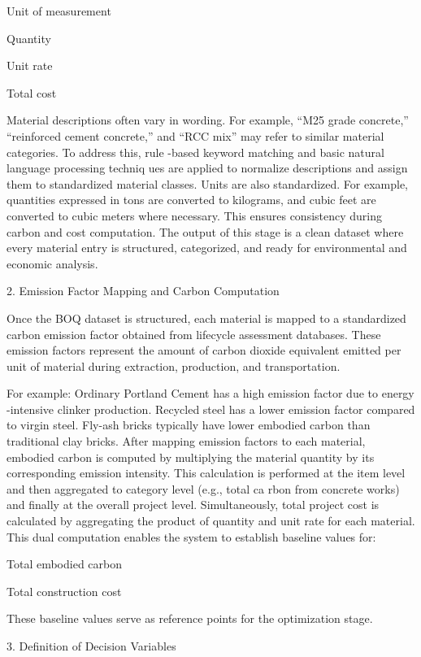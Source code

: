 \documentclass[10pt,twocolumn]{article}
\begin{document}
Unit of measurement  
 
Quantity  
 
Unit rate  
 
Total cost  
 
Material descriptions often vary in wording. For example, “M25 grade concrete,” “reinforced cement 
concrete,” and “RCC mix” may refer to similar material categories. To address this, rule -based 
keyword matching and basic natural language processing techniq ues are applied to normalize 
descriptions and assign them to standardized material classes.  
Units are also standardized. For example, quantities expressed in tons are converted to kilograms, 
and cubic feet are converted to cubic meters where necessary. This ensures consistency during 
carbon and cost computation.  
The output of this stage is a clean dataset where every material entry is structured, categorized, and 
ready for environmental and economic analysis.  
 
2. Emission Factor Mapping and Carbon Computation  
 
Once the BOQ dataset is structured, each material is mapped to a standardized carbon emission 
factor obtained from lifecycle assessment databases. These emission factors represent the amount of 
carbon dioxide equivalent emitted per unit of material during extraction, production, and 
transportation.  
 
For example:  
Ordinary Portland Cement has a high emission factor due to energy -intensive clinker production.  
Recycled steel has a lower emission factor compared to virgin steel.  
Fly-ash bricks typically have lower embodied carbon than traditional clay bricks.  
After mapping emission factors to each material, embodied carbon is computed by multiplying the 
material quantity by its corresponding emission intensity. This calculation is performed at the item 
level and then aggregated to category level (e.g., total ca rbon from concrete works) and finally at the 
overall project level.  
Simultaneously, total project cost is calculated by aggregating the product of quantity and unit rate 
for each material.  
This dual computation enables the system to establish baseline values for:  
 
Total embodied carbon  
 
Total construction cost  
 
These baseline values serve as reference points for the optimization stage.  
 
3. Definition of Decision Variables  
 
\end{document}
